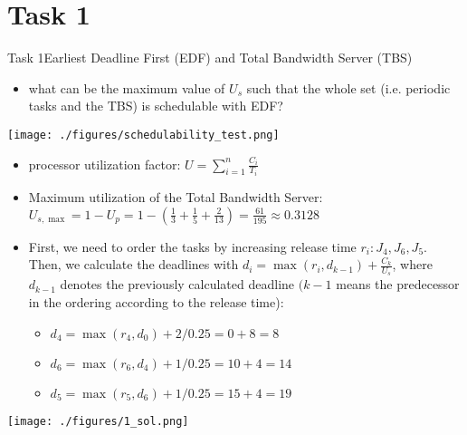 
\section{Task 1}

\setcounter{task}{1}

\begin{frame}[allowframebreaks]{Task 1}{Earliest Deadline First (EDF) and Total Bandwidth Server (TBS)}
  \begin{tasknoinc}
    \begin{itemize}
      \item what can be the maximum value of $U_s$ such that the whole set (i.e. periodic tasks and the \alert{TBS}) is schedulable with \alert{EDF}?
    \end{itemize}
  \end{tasknoinc}
  \begin{requirementsnoinc}
    \texttt{[image: ./figures/schedulability\_test.png]}
    \begin{itemize}
      \item \alert{processor utilization factor:} $U=\sum_{i=1}^n \frac{C_i}{T_i}$
    \end{itemize}
  \end{requirementsnoinc}
  \begin{solution}
    \begin{itemize}
      \item \alert{Maximum utilization of the Total Bandwidth Server:} $U_{s, \max }=1-U_p=1-(\frac{1}{3}+\frac{1}{5}+\frac{2}{13})=\frac{61}{195} \approx 0.3128$
    \end{itemize}
  \end{solution}
\end{frame}

\begin{frame}[allowframebreaks]{}{}
  \begin{solution}
    \begin{itemize}
      \item First, we need to order the tasks by increasing release time $r_i: J_4, J_6, J_5$. Then, we calculate the deadlines with $d_i=\max \left(r_i, d_{k-1}\right)+\frac{C_k}{U_s}$, where $d_{k-1}$ denotes the previously calculated deadline $(k-1$ means the predecessor in the ordering according to the release time):
  \begin{itemize}
    \item $d_4=\max \left(r_4, d_0\right)+2 / 0.25=0+8=8$
    \item $d_6=\max \left(r_6, d_4\right)+1 / 0.25=10+4=14$
    \item $d_5=\max \left(r_5, d_6\right)+1 / 0.25=15+4=19$
  \end{itemize}
    \end{itemize}
  \end{solution}
  \begin{solution}
    \centering
    \texttt{[image: ./figures/1\_sol.png]}
  \end{solution}
\end{frame}
